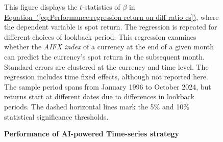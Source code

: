 \documentclass[12pt,oneside,letter]{article}
\newcommand*{\myeq}[1]{\hyperref[{#1}]{Equation~(\ref*{#1})}}
\begin{document}
\begin{appendices}
\begin{landscape}
\begin{figure}
		    
		    \begin{small}
		    This figure displays the $t$-statistics of $\beta$ in \myeq{eq:Performance:regression return on diff ratio cs}, where the dependent variable is spot return. The regression is repeated for different choices of lookback period. This regression examines whether the \textit{AIFX index} of a currency at the end of a given month can predict the currency's spot return in the subsequent month. Standard errors are clustered at the currency and time level. The regression includes time fixed effects, although not reported here. The sample period spans from January 1996 to October 2024, but returns start at different dates due to differences in lookback periods. The dashed horizontal lines mark the 5\% and 10\% statistical significance thresholds. 
		    
		
		    \end{small}
		    
		    
	    \end{figure}
    
\end{landscape}


		\begin{landscape}
	
	\begin{figure}

    \begin{center}
    \caption{\bf Performance of AI-powered Time-series strategy}
    \medskip
     \label{fig:Performance:sharpe ratio TS strategy diff currency usd}
    \end{center}



\end{figure}
\end{landscape}
\end{appendices}
\end{document}
